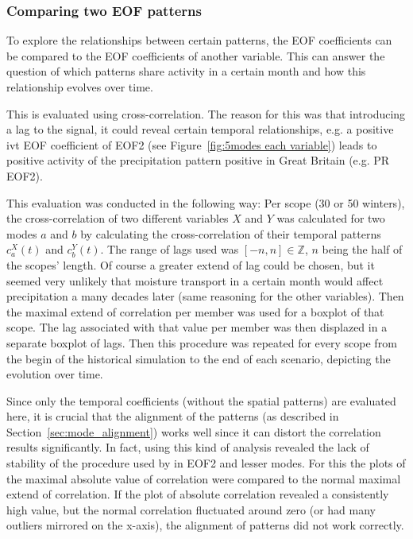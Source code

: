 \subsubsection{Comparing two EOF patterns}

To explore the relationships between certain patterns, the EOF coefficients can be compared to the EOF coefficients of another variable. 
This can answer the question of which patterns share activity in a certain month and how this relationship evolves over time. 

This is evaluated using cross-correlation. 
The reason for this was that introducing a lag to the signal, it could reveal certain temporal relationships, e.g. a positive \ac{ivt} EOF coefficient of EOF2 (see Figure~\ref{fig:5modes each variable}) leads to positive activity of the precipitation pattern positive in Great Britain (e.g. PR EOF2). 

This evaluation was conducted in the following way: 
Per scope (30 or 50 winters), the cross-correlation of two different variables $X$ and $Y$ was calculated for two modes $a$ and $b$ by calculating the cross-correlation of their temporal patterns $c_a^X(t)$ and $c_b^Y(t)$. 
The range of lags used was $[-n,n] \in \mathbb{Z}$, $n$ being the half of the scopes' length. 
Of course a greater extend of lag could be chosen, but it seemed very unlikely that moisture transport in a certain month would affect precipitation a many decades later (same reasoning for the other variables).
Then the maximal extend of correlation per member was used for a boxplot of that scope.
The lag associated with that value per member was then displazed in a separate boxplot of lags. 
Then this procedure was repeated for every scope from the begin of the historical simulation to the end of each scenario, depicting the evolution over time. 

Since only the temporal coefficients (without the spatial patterns) are evaluated here, it is crucial that the alignment of the patterns (as described in Section~\ref{sec:mode_alignment}) works well since it can distort the correlation results significantly. 
In fact, using this kind of analysis revealed the lack of stability of the procedure used by  in EOF2 and lesser modes. 
For this the plots of the maximal absolute value of correlation were compared to the normal maximal extend of correlation. 
If the plot of absolute correlation revealed a consistently high value, but the normal correlation fluctuated around zero (or had many outliers mirrored on the x-axis), the alignment of patterns did not work correctly. 


